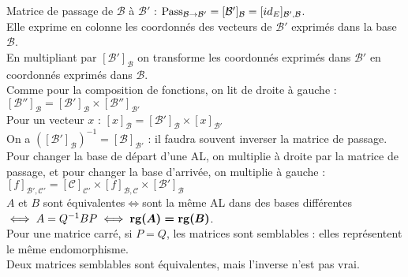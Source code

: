     Matrice de passage de $\mathcal{B}$ à $\mathcal{B}'$ : $\textrm{Pass}_{\mathcal{B} \rightarrow \mathcal{B}'} = [\mathcal{B}']_\mathcal{B} =  [id_E]_{\mathcal{B}',\mathcal{B}}$.\\
    Elle exprime en colonne les coordonnés des vecteurs de $\mathcal{B}'$ exprimés dans la base $\mathcal{B}$.\\
    
    En multipliant par $[\mathcal{B}']_\mathcal{B}$ on transforme les coordonnés exprimés dans $\mathcal{B}'$ en coordonnés exprimés dans $\mathcal{B}$.\\
    Comme pour la composition de fonctions, on lit de droite à gauche : $[\mathcal{B''}]_{\mathcal{B}} = [\mathcal{B'}]_{\mathcal{B}} \times [\mathcal{B}'']_{\mathcal{B}'}$\\
    Pour un vecteur $x$ : $[x]_{\mathcal{B}} = [\mathcal{B'}]_\mathcal{B} \times [x]_{\mathcal{B}'}$
    \vspace{5pt}\\
    On a $([\mathcal{B}']_\mathcal{B})^{-1} = [\mathcal{B}]_{\mathcal{B}'}$ : il faudra souvent inverser la matrice de passage.
    \vspace{5pt}\\
    Pour changer la base de départ d'une AL, on multiplie à droite par la matrice de passage, et pour changer la base d'arrivée, on multiplie à gauche : $[f]_{\mathcal{B}',\mathcal{C}'} = [\mathcal{C}]_{\mathcal{C'}} \times [f]_{\mathcal{B},\mathcal{C}} \times [\mathcal{B'}]_{\mathcal{B}}$\\
    
    $A$ et $B$ sont équivalentes$\iff$sont la même AL dans des bases différentes$\iff A = Q^{-1} B P \iff \boldsymbol{\operatorname{rg}(A) = \operatorname{rg}(B)}$.\\
    Pour une matrice carré, si $P = Q$, les matrices sont semblables : elles représentent le même endomorphisme.\\
    
    Deux matrices semblables sont équivalentes, mais l'inverse n'est pas vrai.

